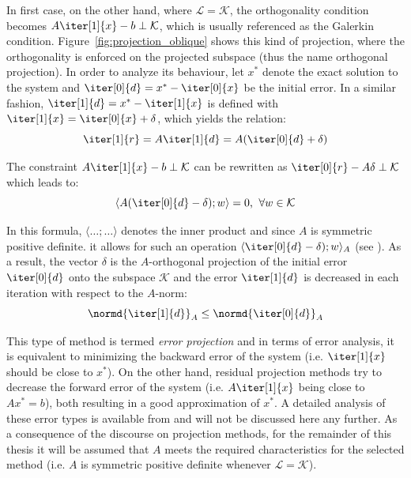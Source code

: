 \noindent In first case, on the other hand, where $\mathcal{L}=\mathcal{K}$, the orthogonality condition becomes $A\iter[1]{x}-b \perp \mathcal{K}$, which is usually referenced as the Galerkin condition. Figure~\hyperref[fig:projection_oblique]{\ref{fig:projection_oblique}} shows this kind of projection, where the orthogonality is enforced on the projected subspace (thus the name orthogonal projection). In order to analyze its behaviour, let $x^*$ denote the exact solution to the system and $\iter[0]{d}=x^*-\iter[0]{x}$ be the initial error. In a similar fashion, $\iter[1]{d} = x^*-\iter[1]{x}$ is defined with $\iter[1]{x}=\iter[0]{x}+\delta$, which yields the relation:
\begin{equation}
    \iter[1]{r} = A\iter[1]{d} = A(\iter[0]{d}+\delta)
\end{equation}

\noindent The constraint $A\iter[1]{x}-b \perp \mathcal{K}$ can be rewritten as $\iter[0]{r}-A\delta \perp \mathcal{K}$ which leads to:
\begin{equation}
    \langle A(\iter[0]{d}-\delta); w\rangle = 0\text{,}\;\; \forall w \in \mathcal{K}
\end{equation}

\noindent In this formula, $\langle\dots;\dots\rangle$ denotes the inner product and since $A$ is symmetric positive definite. it allows for such an operation $\langle \iter[0]{d}-\delta); w\rangle_A$ (see \cite{saad_iterative_2003}). As a result, the vector $\delta$ is the $A$-orthogonal projection of the initial error $\iter[0]{d}$ onto the subspace $\mathcal{K}$ and the error $\iter[1]{d}$ is decreased in each iteration with respect to the $A$-norm:
\begin{equation}
    \normd{\iter[1]{d}}_A \leq \normd{\iter[0]{d}}_A
\end{equation}

\noindent This type of method is termed \textit{error projection} and in terms of error analysis, it is equivalent to minimizing the backward error of the system (i.e. $\iter[1]{x}$ should be close to $x^*$). On the other hand, residual projection methods try to decrease the forward error of the system (i.e. $A\iter[1]{x}$ being close to $Ax^*=b$), both resulting in a good approximation of $x^*$. A detailed analysis of these error types is available from \cite{higham_accuracy_2002} and will not be discussed here any further. As a consequence of the discourse on projection methods, for the remainder of this thesis it will be assumed that $A$ meets the required characteristics for the selected method (i.e. $A$ is symmetric positive definite whenever $\mathcal{L}=\mathcal{K}$).

